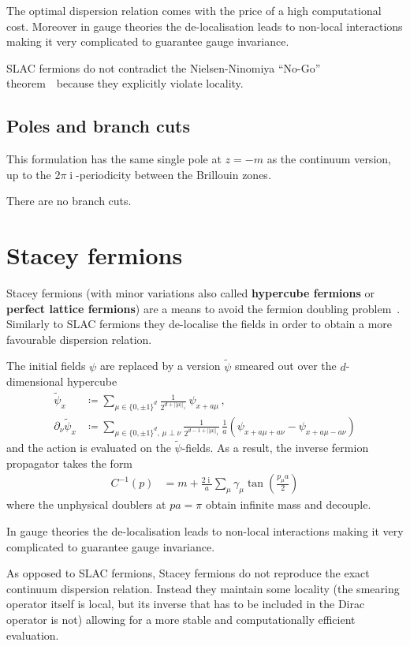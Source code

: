 \documentclass[a4paper]{article}
\DeclareMathOperator{\im}{i}
\newcommand{\nnt}{Nielsen-Ninomiya ``No-Go'' theorem~\cite{NIELSEN1981219}}
\begin{document}
	The optimal dispersion relation comes with the price of a high computational cost.
	Moreover in gauge theories the de-localisation leads to non-local interactions making it very complicated to guarantee gauge invariance.
	
	SLAC fermions do not contradict the \nnt\ because they explicitly violate locality.
	
	\subsection{Poles and branch cuts}
	This formulation has the same single pole at $z=-m$ as the continuum version, up to the $2\pi\im$-periodicity between the Brillouin zones.
	
	There are no branch cuts.
	
	\section{Stacey fermions}
	Stacey fermions (with minor variations also called \textbf{hypercube fermions} or \textbf{perfect lattice fermions}) are a means to avoid the fermion doubling problem~\cite{Stacey_1982,Intro_chiral_sym}. Similarly to SLAC fermions they de-localise the fields in order to obtain a more favourable dispersion relation.
	
	The initial fields $\psi$ are replaced by a version $\tilde\psi$ smeared out over the $d$-dimensional hypercube
	\begin{align}
		\tilde{\psi}_x &\coloneqq \sum_{\mu\in\{0,\pm1\}^d}\frac{1}{2^{d+||\mu||_1}}\,\psi_{x+a\mu}\,,\\
		\partial_\nu\tilde{\psi}_x &\coloneqq \sum_{\mu\in\{0,\pm1\}^d,\,\mu\perp\nu}\frac{1}{2^{d-1+||\mu||_1}}\,\frac1a \left(\psi_{x+a\mu+a\nu}-\psi_{x+a\mu-a\nu}\right)
	\end{align}
	and the action is evaluated on the $\tilde\psi$-fields.
	As a result, the inverse fermion propagator takes the form
	\begin{align}
		C^{-1}(p) &= m + \frac{2\im}{a}\sum_\mu \gamma_\mu\tan\left(\frac{p_\mu a}{2}\right)
	\end{align}
	where the unphysical doublers at $pa=\pi$ obtain infinite mass and decouple.
	
	In gauge theories the de-localisation leads to non-local interactions making it very complicated to guarantee gauge invariance.
	
	As opposed to SLAC fermions, Stacey fermions do not reproduce the exact continuum dispersion relation. Instead they maintain some locality (the smearing operator itself is local, but its inverse that has to be included in the Dirac operator is not) allowing for a more stable and computationally efficient evaluation.
	
\end{document}
